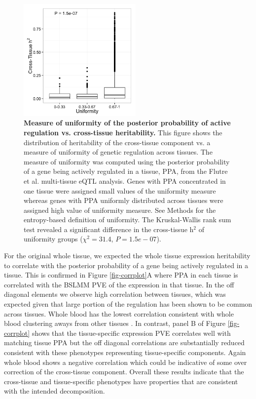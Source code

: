 \documentclass[10pt,letterpaper]{article}
\begin{document}
\begin{figure}[H]
\includegraphics[width=6cm]{Figures/Fig-CT-entropy.png}
\caption{{\bf Measure of uniformity of the posterior probability of active regulation vs. cross-tissue heritability.}
This figure shows the distribution of heritability of the cross-tissue component vs. a measure of uniformity of genetic regulation across tissues. 
The measure of uniformity was computed using the posterior probability of a gene being actively regulated in a tissue, PPA, from the Flutre et al. \cite{Flutre_2013} multi-tissue eQTL analysis. Genes with PPA concentrated in one tissue were assigned small values of the uniformity measure whereas genes with PPA uniformly distributed across tissues were assigned high value of uniformity measure. See Methods for the entropy-based definition of uniformity. The Kruskal-Wallis rank sum test revealed a significant difference in the cross-tissue h$^2$ of uniformity groups ($\chi^2 = 31.4$, $P = 1.5e-07$).}
\label{fig-ct-entropy}
\end{figure}


For the original whole tissue, we expected the whole tissue expression heritability to correlate with the posterior probability of a gene being actively regulated in a tissue. This is confirmed in Figure \ref{fig-corrplot}A where PPA in each tissue is correlated with the BSLMM PVE of the expression in that tissue. In the off diagonal elements we observe high correlation between tissues, which was expected given that large portion of the regulation has been shown to be common across tissues. Whole blood has the lowest correlation  consistent with whole blood clustering aways from other tissues \cite{Ardlie_2015}. In contrast, panel B of Figure \ref{fig-corrplot} shows that the tissue-specific expression PVE correlates well with matching tissue PPA but the off diagonal correlations are substantially reduced consistent with these phenotypes representing tissue-specific components. Again whole blood shows a negative correlation which could be indicative of some over correction of the cross-tissue component. Overall these results indicate that the cross-tissue and tissue-specific phenotypes have properties that are consistent with the intended decomposition.
\end{document}
